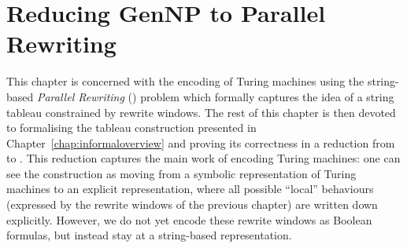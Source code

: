 \newcommand{\winw}[2]{\textsf{window}_{#1}{(#2)}}
\newcommand{\win}[1]{\textsf{window}{(#1)}}
\newcommand{\str}[1]{#1^*}
\newcommand{\prem}[1]{\textsf{prem}~#1}
\newcommand{\conc}[1]{\textsf{conc}~#1}
\newcommand{\rewHead}[3]{\textsf{rewHead}~#1~#2~#3}
\newcommand{\rewAt}[4]{\textsf{rewAt}~#1~#2~#3~#4}
\newcommand{\prefix}[2]{\textsf{prefix}~#1~#2}

\newcommand{\strentE}[1]{\rightsquigarrow_{#1}^E}
\renewcommand{\strent}[1]{\rightsquigarrow_{#1}}

\newcommand{\pFlip}[1]{\textsf{pFlip}~#1}
\newcommand{\pFlipi}[1]{\text{\textasciitilde}#1}
\newcommand{\pRev}{\textsf{pRev}}

\newcommand{\nilstr}[2]{E~#1~#2}

\newcommand{\divides}{\mid}
\newcommand{\notdivides}{\nmid}

\newcommand{\Rtape}{\ensuremath{R_{\text{tape}}}}
\newcommand{\Rtrans}{\ensuremath{R_{\text{trans}}}}
\newcommand{\Rhalt}{\ensuremath{R_{\text{halt}}}}
\newcommand{\Rsim}{\ensuremath{R_{\text{sim}}}}

\newcommand{\isSpecStateSym}[2]{\textsf{stateSym}~#1~#2}
\newcommand{\haltString}[1]{\textsf{haltingString}~#1}
\newcommand{\validCert}[1]{\textsf{validCert}~#1}
\newcommand{\validInput}[1]{\textbf{REPLACE ME}}

\newcommand{\stringForTapeHalf}{\textsf{stringForTapeHalf}}
\newcommand{\stringForConfig}{\textsf{stringForConfig}}

\chapter{Reducing GenNP to Parallel Rewriting}\label{chap:gennp_pr}
This chapter is concerned with the encoding of Turing machines using the string-based \emph{Parallel Rewriting} (\PR{}) problem which formally captures the idea of a string tableau constrained by rewrite windows. 
The rest of this chapter is then devoted to formalising the tableau construction presented in Chapter~\ref{chap:informaloverview} and proving its correctness in a reduction from \gennp{} to \PR{}.
This reduction captures the main work of encoding Turing machines: one can see the construction as moving from a symbolic representation of Turing machines to an explicit representation, where all possible ``local'' behaviours (expressed by the rewrite windows of the previous chapter) are written down explicitly. 
However, we do not yet encode these rewrite windows as Boolean formulas, but instead stay at a string-based representation.

